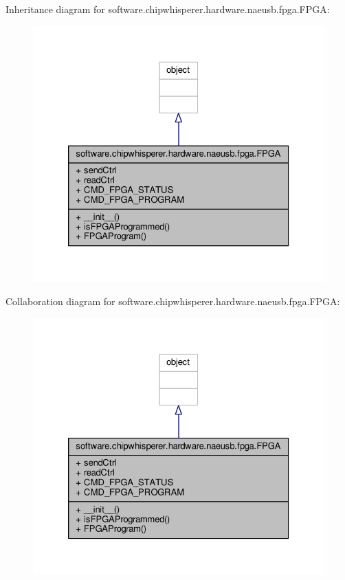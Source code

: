 Inheritance diagram for software.\+chipwhisperer.\+hardware.\+naeusb.\+fpga.\+F\+P\+G\+A\+:\nopagebreak
\begin{figure}[H]
\begin{center}
\leavevmode
\includegraphics[width=326pt]{d6/d6d/classsoftware_1_1chipwhisperer_1_1hardware_1_1naeusb_1_1fpga_1_1FPGA__inherit__graph}
\end{center}
\end{figure}


Collaboration diagram for software.\+chipwhisperer.\+hardware.\+naeusb.\+fpga.\+F\+P\+G\+A\+:\nopagebreak
\begin{figure}[H]
\begin{center}
\leavevmode
\includegraphics[width=326pt]{d4/d79/classsoftware_1_1chipwhisperer_1_1hardware_1_1naeusb_1_1fpga_1_1FPGA__coll__graph}
\end{center}
\end{figure}



